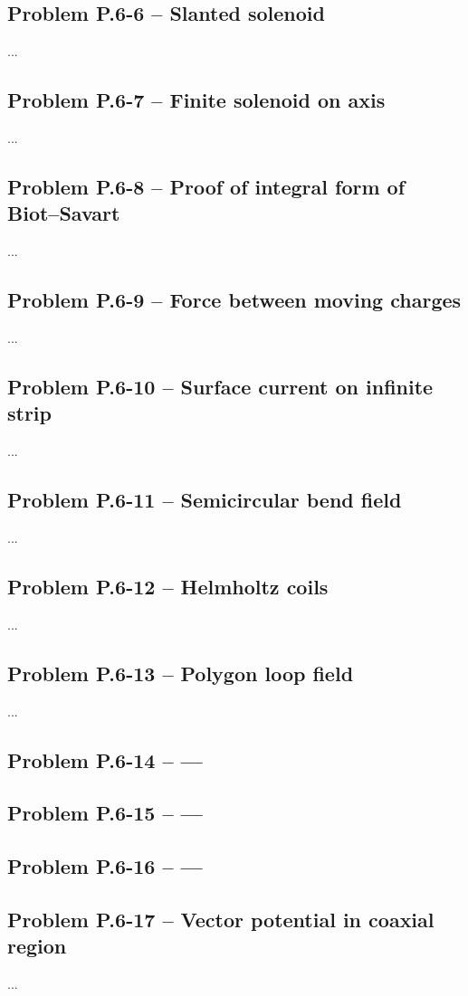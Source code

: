 \documentclass[12pt]{article}
\begin{document}
\bigskip
\subsection*{Problem P.6-6 – Slanted solenoid}
...
\bigskip
\subsection*{Problem P.6-7 – Finite solenoid on axis}
...
\bigskip
\subsection*{Problem P.6-8 – Proof of integral form of Biot–Savart}
...
\bigskip
\subsection*{Problem P.6-9 – Force between moving charges}
...
\bigskip
\subsection*{Problem P.6-10 – Surface current on infinite strip}
...
\bigskip
\subsection*{Problem P.6-11 – Semicircular bend field}
...
\bigskip
\subsection*{Problem P.6-12 – Helmholtz coils}
...
\bigskip
\subsection*{Problem P.6-13 – Polygon loop field}
...
\bigskip
\subsection*{Problem P.6-14 – ---}

\bigskip
\subsection*{Problem P.6-15 – ---}

\bigskip
\subsection*{Problem P.6-16 – ---}

\bigskip
\subsection*{Problem P.6-17 – Vector potential in coaxial region}
...
\bigskip
\end{document}
